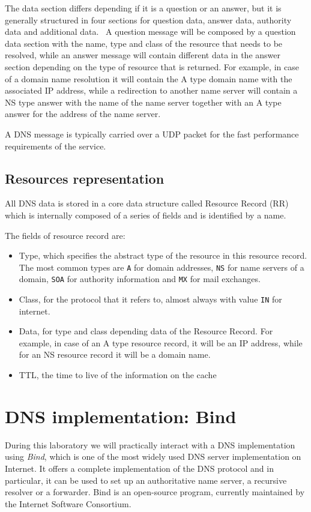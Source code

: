 \documentclass[11pt,a4paper]{article}
\begin{document}
\noindent
The data section differs depending if it is a question or an answer, but it is generally structured in four sections for question data, answer data, authority data and additional data. 
A question message will be composed by a question data section with the name, type and class of the resource that needs to be resolved, while an answer message will contain different data in the answer section depending on the type of resource that is returned. For example, in case of a domain name resolution it will contain the A type domain name with the associated IP address, while a redirection to another name server will contain a NS type answer with the name of the name server together with an A type answer for the address of the name server.

\hfill \break
\noindent
A DNS message is typically carried over a UDP packet for the fast performance requirements of the service.

\subsection{Resources representation}
All DNS data is stored in a core data structure called Resource Record (RR) which is internally composed of a series of fields and is identified by a name.

\hfill \break
\noindent
The fields of resource record are:
\begin{itemize}
\item Type, which specifies the abstract type of the resource in this resource record. The most common types are \texttt{A} for domain addresses, \texttt{NS} for name servers of a domain, \texttt{SOA} for authority information and \texttt{MX} for mail exchanges.
\item Class, for the protocol that it refers to, almost always with value \texttt{IN} for internet.
\item Data, for type and class depending data of the Resource Record. For example, in case of an A type resource record, it will be an IP address, while for an NS resource record it will be a domain name.
\item TTL, the time to live of the information on the cache
\end{itemize}

\section{DNS implementation: Bind}

During this laboratory we will practically interact with a DNS implementation using \emph{Bind}, which is one of the most widely used DNS server implementation on Internet. It offers a complete implementation of the DNS protocol and in particular, it can be used to set up an authoritative name server, a recursive resolver or a forwarder. Bind is an open-source program, currently maintained by the Internet Software Consortium.
\end{document}
